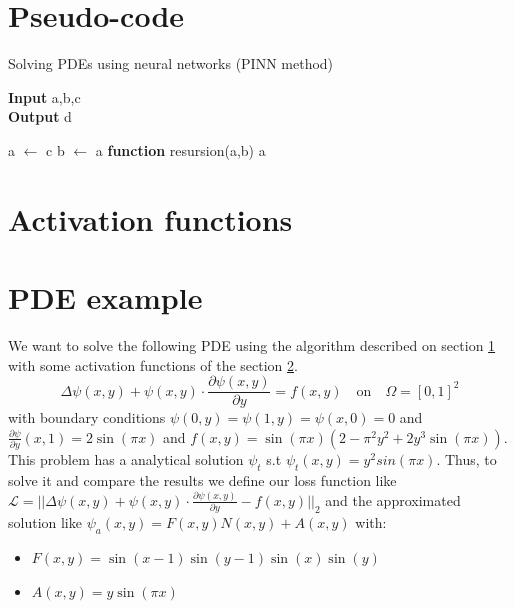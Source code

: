 \newpage
\section{Pseudo-code}
\label{pseudo_code}
\begin{algorithm}[H]
    \caption*{Solving PDEs using neural networks (PINN method)}
    \hspace*{\algorithmicindent} \textbf{Input} a,b,c\\
    \hspace*{\algorithmicindent} \textbf{Output} d
    \begin{algorithmic}
    \STATE a $\leftarrow$ c
    \STATE b $\leftarrow$ a
    \STATE \textbf{function} \quad resursion(a,b)
        \bindent
        \RETURN a
        \eindent
    \end{algorithmic}
    \end{algorithm}

\section{Activation functions}
\label{activation}

\newpage
\section{PDE example}
\label{pde_example}
We want to solve the following PDE using the algorithm described on section \ref{pseudo_code} with some activation functions of the section \ref{activation}.
\begin{equation}
    \Delta \psi(x,y) +\psi(x,y)\cdot\frac{\partial \psi(x,y)}{\partial y}= f(x,y) \quad\text{on}\quad \Omega = [0,1]^2  
\end{equation}
with boundary conditions $\psi(0,y)=\psi(1,y)=\psi(x,0)=0$ and $\frac{\partial \psi}{\partial y}(x,1)=2\sin(\pi x)$           
and $f(x, y)=\sin(\pi x)(2-\pi^2y^2+2y^3\sin(\pi x))$. 
\newline
This problem has a analytical solution $\psi_t$ s.t $\psi_t(x, y)=y^2sin(\pi x)$. Thus, to solve it and compare the results we define our loss function like $\mathcal{L} = ||\Delta \psi(x,y) +\psi(x,y)\cdot\frac{\partial \psi(x,y)}{\partial y}-f(x,y) ||_2$  
and the approximated solution like $\psi_a(x,y)=F(x,y)N(x,y)+A(x,y)$ with:
\begin{itemize}
    \item $F(x,y)=\sin(x-1)\sin(y-1)\sin(x)\sin(y)$
    \item $A(x,y)=y\sin(\pi x)$        
\end{itemize}

